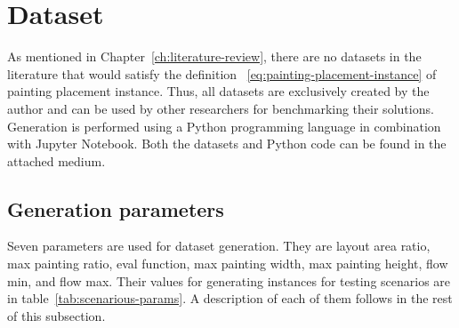 \section{Dataset}\label{sec:dataset}

As mentioned in Chapter~\ref{ch:literature-review}, there are no datasets in the
literature that would satisfy the definition ~\ref{eq:painting-placement-instance} of painting placement instance.
Thus, all datasets are exclusively created by the author and can be used by other researchers
for benchmarking their solutions.
Generation is performed using a Python programming language in combination with Jupyter Notebook.
Both the datasets and Python code can be found in the attached medium.

\subsection{Generation parameters}\label{subsec:generation-parameters}

Seven parameters are used for dataset generation.
They are layout area ratio, max painting ratio, eval function, max painting width, max painting height, flow min, and flow max.
Their values for generating instances for testing scenarios are in table~\ref{tab:scenarious-params}.
A description of each of them follows in the rest of this subsection.

